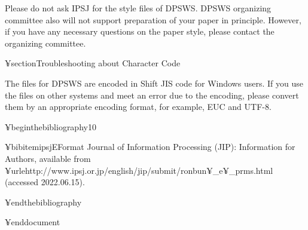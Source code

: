Please do not ask IPSJ for the style files of DPSWS. 
DPSWS organizing committee 
also will not support preparation of your paper in principle. 
However, 
if you have any necessary questions on the paper style, 
please contact the organizing committee. 


¥section{Troubleshooting about Character Code}

The files for DPSWS are encoded in Shift JIS code for Windows users.
If you use the files on other systems and meet an error due to the encoding, please convert them by an appropriate encoding format, for example, EUC and UTF-8.



¥begin{thebibliography}{10}                                                    

¥bibitem{ipsjEFormat}
Journal of Information Processing (JIP): 
Information for Authors,
available from ¥urle{http://www.ipsj.or.jp/english/jip/submit/ronbun¥_e¥_prms.html} (accessed 2022.06.15).

¥end{thebibliography}

¥end{document}
